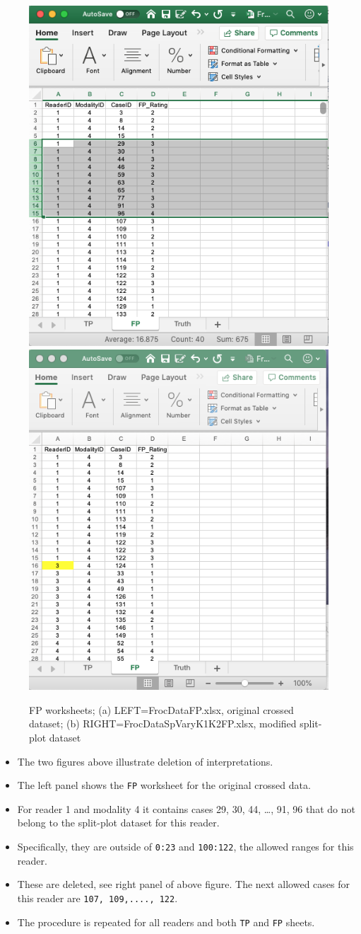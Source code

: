 \documentclass[]{book}
\providecommand{\tightlist}{%
  \setlength{\itemsep}{0pt}\setlength{\parskip}{0pt}}
\begin{document}
\begin{figure}

{\centering \includegraphics[width=0.5\linewidth,height=0.2\textheight]{images/frocDataFP} \includegraphics[width=0.5\linewidth,height=0.2\textheight]{images/frocDataSpVaryK1K2FP} 

}

\caption{FP worksheets; (a) LEFT=FrocDataFP.xlsx, original crossed dataset; (b) RIGHT=FrocDataSpVaryK1K2FP.xlsx, modified split-plot dataset}\label{fig:frocDataSpVaryK1K2FP}
\end{figure}

\begin{itemize}
\tightlist
\item
  The two figures above illustrate deletion of interpretations.
\item
  The left panel shows the \texttt{FP} worksheet for the original crossed data.
\item
  For reader 1 and modality 4 it contains cases 29, 30, 44, \ldots{}, 91, 96 that do not belong to the split-plot dataset for this reader.
\item
  Specifically, they are outside of \texttt{0:23} and \texttt{100:122}, the allowed ranges for this reader.
\item
  These are deleted, see right panel of above figure. The next allowed cases for this reader are \texttt{107,\ 109,....,\ 122}.
\item
  The procedure is repeated for all readers and both \texttt{TP} and \texttt{FP} sheets.
\end{itemize}
\end{document}
